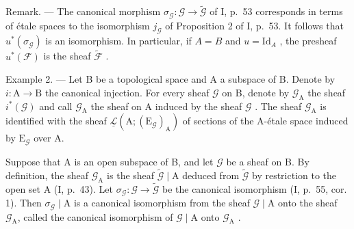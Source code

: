 Remark. --- The canonical morphism \(\sigma_{\mathcal{G}}\colon\mathcal{G}\to\widetilde{\mathcal{G}}\) of I, p.~53 corresponds in terms of étale spaces to the isomorphism \(j_{\mathcal{G}}\) of Proposition 2 of I, p.~53. It follows that \(u^{*}(\sigma_{\mathcal{G}})\) is an isomorphism. In particular, if \(A = B\) and \(u = \mathrm{Id}_A\) , the presheaf \(u^{*}(\mathcal{F})\) is the sheaf \(\widetilde{\mathcal{F}}\) .

Example 2. --- Let B be a topological space and A a subspace of B. Denote by \(i\colon\mathrm{A}\to\mathrm{B}\) the canonical injection. For every sheaf \(\mathcal{G}\) on B, denote by \(\mathcal{G}_{\mathrm{A}}\) the sheaf \(i^{*}(\mathcal{G})\) and call \(\mathcal{G}_{\mathrm{A}}\) the sheaf on A induced by the sheaf \(\mathcal{G}\) . The sheaf \(\mathcal{G}_{\mathrm{A}}\) is identified with the sheaf \(\underline{\mathcal{L}}(\mathrm{A};(\mathrm{E}_{\mathcal{G}})_{\mathrm{A}})\) of sections of the A-étale space induced by \(\mathrm{E}_{\mathcal{G}}\) over A.

Suppose that A is an open subspace of B, and let \(\mathcal{G}\) be a sheaf on B. By definition, the sheaf \(\mathcal{G}_{\mathrm{A}}\) is the sheaf \(\widetilde{\mathcal{G}}\mid \mathrm{A}\) deduced from \(\widetilde{\mathcal{G}}\) by restriction to the open set A (I, p.~43). Let \(\sigma_{\mathcal{G}}\colon \mathcal{G}\to \widetilde{\mathcal{G}}\) be the canonical isomorphism (I, p.~55, cor. 1). Then \(\sigma_{\mathcal{G}}\mid \mathrm{A}\) is a canonical isomorphism from the sheaf \(\mathcal{G}\mid \mathrm{A}\) onto the sheaf \(\mathcal{G}_{\mathrm{A}}\), called the canonical isomorphism of \(\mathcal{G}\mid \mathrm{A}\) onto \(\mathcal{G}_{\mathrm{A}}\) .

